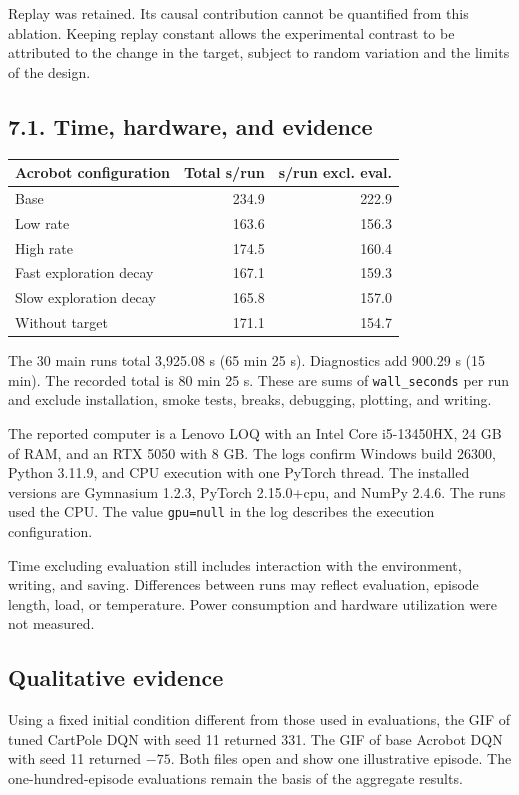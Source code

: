 \documentclass[10pt,a4paper,twocolumn]{extarticle}
\newenvironment{reporttable}
 {\par\noindent\begin{minipage}{\columnwidth}\small\renewcommand{\arraystretch}{1.13}}
 {\end{minipage}\par}
\begin{document}
Replay was retained. Its causal contribution cannot be quantified from this ablation. Keeping replay constant allows the experimental contrast to be attributed to the change in the target, subject to random variation and the limits of the design.

\newpage
\subsection*{7.1. Time, hardware, and evidence}
\begin{reporttable}
\begin{tabularx}{\linewidth}{@{}Xrr@{}}
\toprule
Acrobot configuration & Total s/run & s/run excl. eval. \\
\midrule
Base & 234.9 & 222.9 \\
Low rate & 163.6 & 156.3 \\
High rate & 174.5 & 160.4 \\
Fast exploration decay & 167.1 & 159.3 \\
Slow exploration decay & 165.8 & 157.0 \\
Without target & 171.1 & 154.7 \\
\bottomrule
\end{tabularx}
\end{reporttable}

The 30 main runs total 3,925.08 s (65 min 25 s). Diagnostics add 900.29 s (15 min). The recorded total is 80 min 25 s. These are sums of \texttt{wall\_seconds} per run and exclude installation, smoke tests, breaks, debugging, plotting, and writing.

The reported computer is a Lenovo LOQ with an Intel Core i5-13450HX, 24 GB of RAM, and an RTX 5050 with 8 GB. The logs confirm Windows build 26300, Python 3.11.9, and CPU execution with one PyTorch thread. The installed versions are Gymnasium 1.2.3, PyTorch 2.15.0+cpu, and NumPy 2.4.6. The runs used the CPU. The value \texttt{gpu=null} in the log describes the execution configuration.

Time excluding evaluation still includes interaction with the environment, writing, and saving. Differences between runs may reflect evaluation, episode length, load, or temperature. Power consumption and hardware utilization were not measured.

\subsection*{Qualitative evidence}
Using a fixed initial condition different from those used in evaluations, the GIF of tuned CartPole DQN with seed 11 returned 331. The GIF of base Acrobot DQN with seed 11 returned $-75$. Both files open and show one illustrative episode. The one-hundred-episode evaluations remain the basis of the aggregate results.
\end{document}
